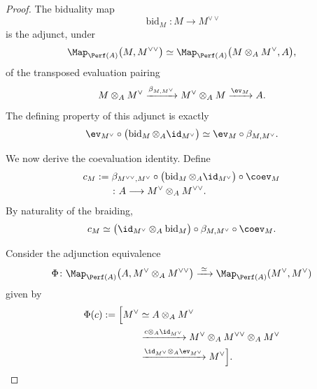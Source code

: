 \begin{proof}
The biduality map
\[
    \operatorname{bid}_M
    \colon
    M
    \longrightarrow
    M^{\vee\vee}
\]
is the adjunct, under
\[
    \Map_{\Perf(A)}
    \bigl(
        M,
        M^{\vee\vee}
    \bigr)
    \simeq
    \Map_{\Perf(A)}
    \bigl(
        M\otimes_A M^\vee,
        A
    \bigr),
\]
of the transposed evaluation pairing
\[
    M\otimes_A M^\vee
    \xrightarrow{\beta_{M,M^\vee}}
    M^\vee\otimes_A M
    \xrightarrow{\ev_M}
    A.
\]
The defining property of this adjunct is exactly
\[
    \ev_{M^\vee}
    \circ
    \bigl(
        \operatorname{bid}_M
        \otimes_A
        \id_{M^\vee}
    \bigr)
    \simeq
    \ev_M
    \circ
    \beta_{M,M^\vee}.
\]

We now derive the coevaluation identity. Define
\[
\begin{aligned}
    c_M
    :={}&
    \beta_{M^{\vee\vee},M^\vee}
    \circ
    \bigl(
        \operatorname{bid}_M
        \otimes_A
        \id_{M^\vee}
    \bigr)
    \circ
    \coev_M
    \\
    &\colon
    A
    \longrightarrow
    M^\vee\otimes_A M^{\vee\vee}.
\end{aligned}
\]
By naturality of the braiding,
\[
    c_M
    \simeq
    \bigl(
        \id_{M^\vee}
        \otimes_A
        \operatorname{bid}_M
    \bigr)
    \circ
    \beta_{M,M^\vee}
    \circ
    \coev_M.
\]

Consider the adjunction equivalence
\[
\begin{aligned}
    \Phi
    \colon
    \Map_{\Perf(A)}
    \bigl(
        A,
        M^\vee\otimes_A M^{\vee\vee}
    \bigr)
    \xrightarrow{\;\simeq\;}
    \Map_{\Perf(A)}(M^\vee,M^\vee)
\end{aligned}
\]
given by
\[
\begin{aligned}
    \Phi(c)
    :=
    \Bigl[
    M^\vee
    &\simeq
    A\otimes_A M^\vee
    \\
    &\xrightarrow{
        c\otimes_A\id_{M^\vee}
    }
    M^\vee
    \otimes_A
    M^{\vee\vee}
    \otimes_A
    M^\vee
    \\
    &\xrightarrow{
        \id_{M^\vee}
        \otimes_A
        \ev_{M^\vee}
    }
    M^\vee
    \Bigr].
\end{aligned}
\]


\end{proof}
